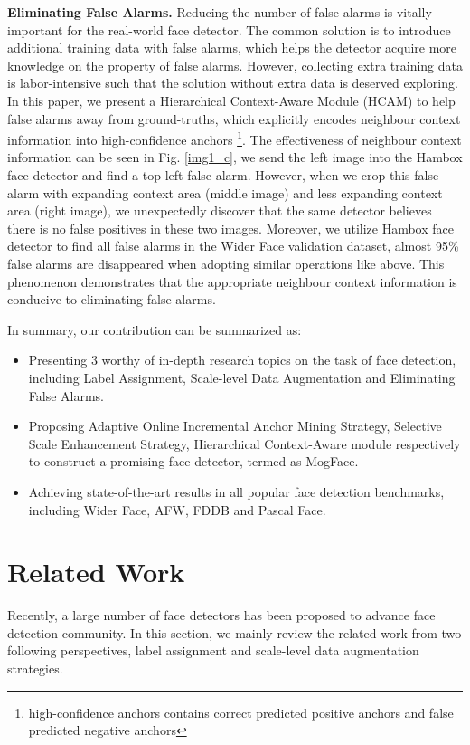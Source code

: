 \documentclass[10pt,twocolumn,letterpaper]{article}
\begin{document}
\noindent\textbf{Eliminating False Alarms.}
Reducing the number of false alarms is vitally important for the real-world face detector. The common solution is to introduce additional training data with false alarms, which helps the detector acquire more knowledge on the property of false alarms. However, collecting  extra training data is labor-intensive such that the solution without extra data is deserved exploring.  
In this paper, we  present a  Hierarchical Context-Aware Module (HCAM) to help false alarms away from ground-truths, which  explicitly encodes neighbour context information into high-confidence anchors \footnote{high-confidence anchors contains correct predicted positive anchors and false predicted negative anchors}. 
The effectiveness of neighbour context information can be seen in Fig. \ref{img1_c}, we send the left image into the Hambox \cite{liu2019hambox} face detector and find a top-left false alarm. However, when we crop this false alarm with expanding context area (middle image) and less expanding context area (right image), we unexpectedly discover that the same detector believes there is no false positives in these two images. Moreover, we utilize Hambox face detector to find all false alarms in the Wider Face validation dataset, almost 95\% false alarms are disappeared when adopting similar operations like above. This phenomenon demonstrates that the appropriate neighbour context information is conducive to eliminating false alarms. 

In summary, our contribution can be summarized as:
\begin{itemize}
\setlength{\itemsep}{0pt}
    \item Presenting 3 worthy of in-depth research topics on the task of face detection, including Label Assignment, Scale-level Data Augmentation and Eliminating False Alarms.
    \item Proposing Adaptive Online Incremental Anchor Mining Strategy, Selective Scale Enhancement Strategy, Hierarchical Context-Aware module respectively to construct a promising face detector, termed as MogFace. 
    \item Achieving state-of-the-art results in all popular face detection  benchmarks, including  Wider Face, AFW, FDDB and Pascal Face. 
\end{itemize}










\section{Related Work}
Recently, a large number of face detectors \cite{liu2020hambox, liu2020bfbox, guo2021sample, tang2018pyramidbox, deng2019retinaface, li2019dsfd} has been proposed to advance face detection community. In this section, we mainly review the related work from two following perspectives, label assignment and scale-level data augmentation strategies.
\end{document}
